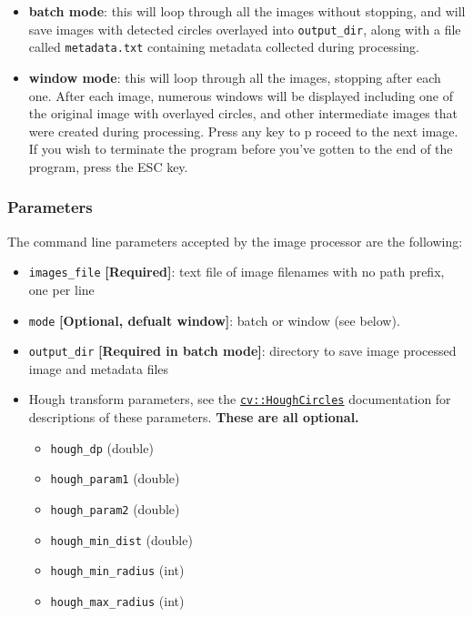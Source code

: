 \documentclass[10pt, onecolumn, draftclsnofoot, letterpaper, compsoc]{IEEEtran}
\begin{document}
\begin{itemize}
	\item \textbf{batch mode}: this will loop through all the images without stopping, and will save images
	with detected circles overlayed into \texttt{output\_dir}, along with a file called
	\texttt{metadata.txt} containing metadata collected during processing.

	\item \textbf{window mode}: this will loop through all the images, stopping after each one. After each
	image, numerous windows will be displayed including one of the original image with overlayed
	circles, and other intermediate images that were created during processing. Press any key to p
	roceed to the next image. If you wish to terminate the program before you've gotten to the end
	of the program, press the ESC key.
\end{itemize}

\subsubsection{Parameters}
The command line parameters accepted by the image processor are the following:

\begin{itemize}
	\item \texttt{images\_file} \textbf{[Required]}: text file of image filenames with no path prefix, one per line

	\item \texttt{mode} \textbf{[Optional, defualt window]}: batch or window (see below).

	\item \texttt{output\_dir} \textbf{[Required in batch mode]}: directory to save image processed image and metadata files

	\item Hough transform parameters, see the \href{http://docs.opencv.org/2.4/modules/imgproc/doc/feature_detection.html?highlight=houghcircles}{\texttt{cv::HoughCircles}}
	documentation for descriptions of these parameters. \textbf{These are all optional.}
		\begin{itemize}
			\item \texttt{hough\_dp} (double)

			\item \texttt{hough\_param1} (double)

			\item \texttt{hough\_param2} (double)

			\item \texttt{hough\_min\_dist} (double)

			\item \texttt{hough\_min\_radius} (int)

			\item \texttt{hough\_max\_radius} (int)
		\end{itemize}
\end{itemize}
\end{document}
